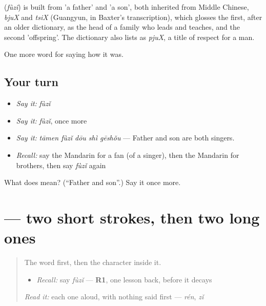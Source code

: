 \begin{cousinweb}
\textbf{} (\emph{fùzǐ}) is built from  'a father' and  'a son', both inherited from Middle Chinese, \emph{bjuX} and \emph{tsiX} (Guangyun, in Baxter's transcription), which glosses the first, after an older dictionary, as the head of a family who leads and teaches, and the second 'offspring'. The dictionary also lists  as \emph{pjuX}, a title of respect for a man.
\end{cousinweb}

\begin{grammarlens}[title={What you've built}]
One more word for saying how it was.
\end{grammarlens}

\subsection*{Your turn}
\begin{itemize}
\raggedright
  \item \emph{Say it:} \emph{fùzǐ}
  \item \emph{Say it:} \emph{fùzǐ}, once more
  \item \emph{Say it:} \emph{tāmen fùzǐ dōu shì gēshǒu} — Father and son are both singers.
  \item \emph{Recall:} say the Mandarin for a fan (of a singer), then the Mandarin for brothers, then say \emph{fùzǐ} again
\end{itemize}

\begin{tcolorbox}[breakable,colback=teal!4,colframe=teal!35!black,title={Before you move on}]
What does  mean? (\textquotedblleft{}Father and son\textquotedblright{}.) Say it once more.
\end{tcolorbox}
\section[\texorpdfstring{\zh{父} (fù)}{父 (fù)}]{ — two short strokes, then two long ones}

\label{lesson:ZH-W507-fu-father}



\begin{quote}
The word first, then the character inside it.

\begin{itemize}
\raggedright
  \item \emph{Recall:} say \emph{fùzǐ} — \textbf{R1}, one lesson back, before it decays
\end{itemize}

\begin{quote}
 
\end{quote}

\emph{Read it:} each one aloud, with nothing said first — \emph{rén}, \emph{zǐ}
\end{quote}

